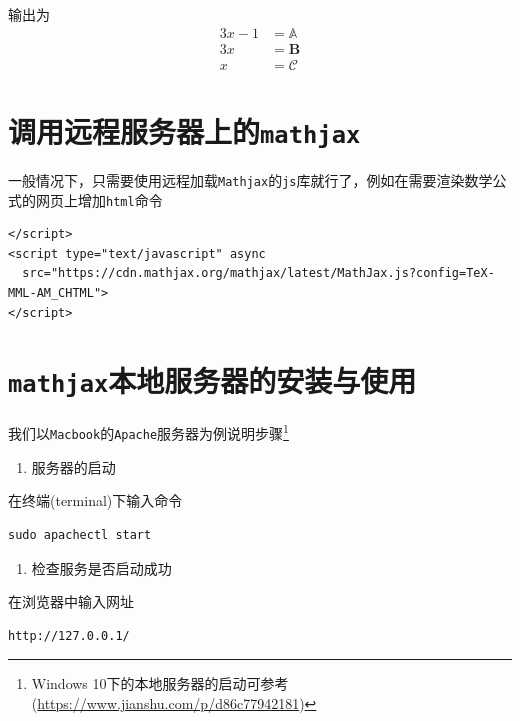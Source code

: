 \documentclass[12pt,]{krantz}
\providecommand{\tightlist}{%
  \setlength{\itemsep}{0pt}\setlength{\parskip}{0pt}}
\theoremstyle{plain}
\theoremstyle{nonumberplain}
\begin{document}
输出为
\begin{align}
3x-1 &= \mathbb{A} \\
  3x &= \mathbf{B} \\
   x &= \mathscr{C}
\end{align}

\hypertarget{sec9-2}{%
\section{\texorpdfstring{调用远程服务器上的\texttt{mathjax}}{调用远程服务器上的mathjax}}\label{sec9-2}}

\indent

一般情况下，只需要使用远程加载\texttt{Mathjax}的\texttt{js}库就行了，例如在需要渲染数学公式的网页上增加\texttt{html}命令

\begin{verbatim}
</script>
<script type="text/javascript" async
  src="https://cdn.mathjax.org/mathjax/latest/MathJax.js?config=TeX-MML-AM_CHTML">
</script>
\end{verbatim}

\hypertarget{sec9-3}{%
\section{\texorpdfstring{\texttt{mathjax}本地服务器的安装与使用}{mathjax本地服务器的安装与使用}}\label{sec9-3}}

\indent

我们以\texttt{Macbook}的\texttt{Apache}服务器为例说明步骤\footnote{Windows 10下的本地服务器的启动可参考(\url{https://www.jianshu.com/p/d86c77942181})}

\begin{enumerate}
\def\labelenumi{\arabic{enumi}.}
\tightlist
\item
  服务器的启动
\end{enumerate}

在终端(terminal)下输入命令

\begin{verbatim}
sudo apachectl start
\end{verbatim}

\begin{enumerate}
\def\labelenumi{\arabic{enumi}.}
\setcounter{enumi}{1}
\tightlist
\item
  检查服务是否启动成功
\end{enumerate}

在浏览器中输入网址

\begin{verbatim}
http://127.0.0.1/ 
\end{verbatim}
\end{document}
